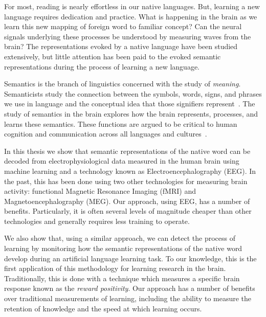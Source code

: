 \label{chapter:introduction}

For most, reading is nearly effortless in our native languages. But, learning a 
new language requires dedication and practice. What is happening in the brain 
as we learn this new mapping of foreign word to familiar concept? Can the 
neural signals underlying these processes be understood by measuring waves from 
the brain? The representations evoked by a native language have been studied 
extensively, but little attention has been paid to the evoked semantic 
representations during the process of learning a new language.
 
Semantics is the branch of linguistics concerned with the study of 
\emph{meaning}. Semanticists study the connection between the symbols, words, 
signs, and phrases we use in language and the conceptual idea that those 
signifiers represent~\cite{kreidler2002introducing}. The study of semantics in 
the brain explores how the brain represents, processes, and learns these 
semantics. These functions are argued to be critical to human cognition and 
communication across all languages and cultures~\cite{croft2004cognitive}.

In this thesis we show that semantic representations of the native word can be 
decoded from electrophysiological data measured in the human brain using 
machine learning and a technology known as Electroencephalography (EEG). In the 
past, this has been done using two other technologies for measuring brain 
activity: functional Magnetic Resonance Imaging (fMRI) and 
Magnetoencephalography (MEG).  Our approach, using EEG, has a number of 
benefits. Particularly, it is often several levels of magnitude cheaper than 
other technologies and generally requires less training to operate.

We also show that, using a similar approach, we can detect the process of 
learning by monitoring how the semantic representations of the native word 
develop during an artificial language learning task. To our knowledge, this is 
the first application of this methodology for learning research in the brain.  
Traditionally, this is done with a technique which measures a specific brain 
response known as the \emph{reward positivity}. Our approach has a number of 
benefits over traditional measurements of learning, including the ability to 
measure the retention of knowledge and the speed at which learning occurs.







